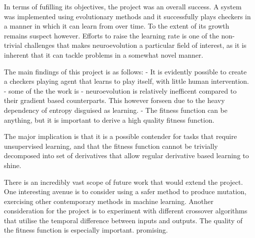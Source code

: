 \documentclass[12pt,a4paper]{article}
\begin{document}
    In terms of fufilling its objectives, the project was an overall success. A system was implemented using evolutionary methods and it successfully plays checkers in a manner in which it can learn from over time. To the extent of its growth remains suspect however. Efforts to raise the learning rate is one of the non-trivial challenges that makes neuroevolution a particular field of interest, as it is inherent that it can tackle problems in a somewhat novel manner.
    
    The main findings of this project is as follows:
    - It is evidently possible to create a checkers playing agent that learns to play itself, with little human intervention.
    - some of the the work is 
    - neuroevolution is relatively inefficent compared to their gradient based counterparts. This however forseen due to the heavy dependency of entropy disguised as learning.
    - The fitness function can be anything, but it is important to derive a high quality fitness function.
    
    The major implication is that it is a possible contender for tasks that require unsupervised learning, and that the fitness function cannot be trivially decomposed into set of derivatives that allow regular derivative based learning to shine.
    
    
    There is an incredibly vast scope of future work that would extend the project. One interesting avenue is to consider using a safer method to produce mutation, exercising other contemporary methods in machine learning. 
    Another consideration for the project is to experiment with different crossover algorithms that utilise the temporal difference between inputs and outputs. 
    The quality of the fitness function is especially important.
    promising.


    

\end{document}
